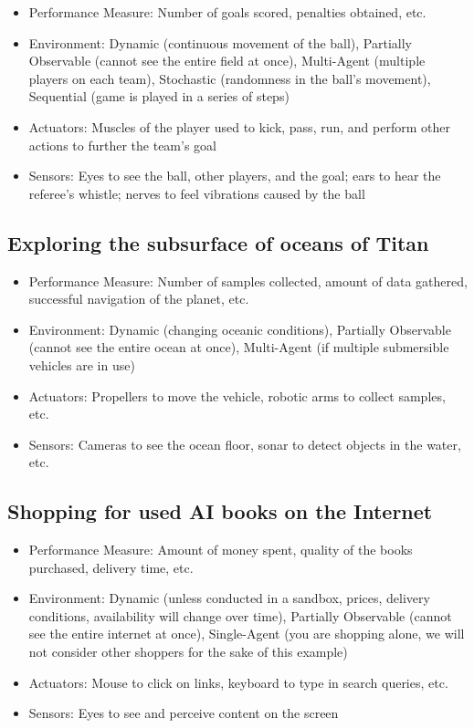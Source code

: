 \documentclass{article}
\begin{document}
\begin{itemize}
    \item Performance Measure: Number of goals scored, penalties obtained, etc.
    \item Environment: Dynamic (continuous movement of the ball), Partially Observable (cannot see the entire field at once), Multi-Agent (multiple players on each team), Stochastic (randomness in the ball's movement), Sequential (game is played in a series of steps)
    \item Actuators: Muscles of the player used to kick, pass, run, and perform other actions to further the team's goal
    \item Sensors: Eyes to see the ball, other players, and the goal; ears to hear the referee's whistle; nerves to feel vibrations caused by the ball
\end{itemize}

\subsection*{Exploring the subsurface of oceans of Titan}

\begin{itemize}
    \item Performance Measure: Number of samples collected, amount of data gathered, successful navigation of the planet, etc.
    \item Environment: Dynamic (changing oceanic conditions), Partially Observable (cannot see the entire ocean at once), Multi-Agent (if multiple submersible vehicles are in use)
    \item Actuators: Propellers to move the vehicle, robotic arms to collect samples, etc.
    \item Sensors: Cameras to see the ocean floor, sonar to detect objects in the water, etc.
\end{itemize}

\subsection*{Shopping for used AI books on the Internet}

\begin{itemize}
    \item Performance Measure: Amount of money spent, quality of the books purchased, delivery time, etc.
    \item Environment: Dynamic (unless conducted in a sandbox, prices, delivery conditions, availability will change over time), Partially Observable (cannot see the entire internet at once), Single-Agent (you are shopping alone, we will not consider other shoppers for the sake of this example)
    \item Actuators: Mouse to click on links, keyboard to type in search queries, etc.
    \item Sensors: Eyes to see and perceive content on the screen
\end{itemize}
\end{document}
